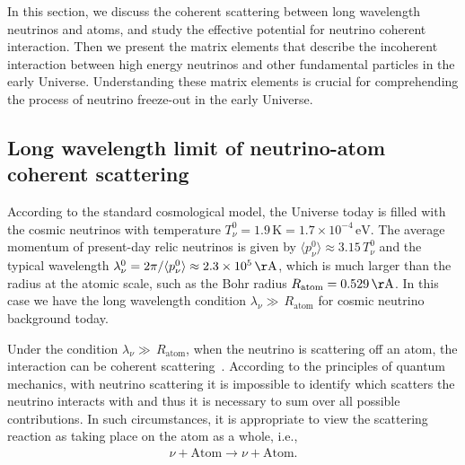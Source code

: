 In this section, we discuss the coherent scattering between long wavelength neutrinos and atoms, and study the effective potential for neutrino coherent interaction. Then we present the matrix elements that describe the incoherent interaction between high energy neutrinos and other fundamental particles in the early Universe. Understanding these matrix elements is crucial for comprehending the process of neutrino freeze-out in the early Universe.


\subsection{Long wavelength limit of neutrino-atom coherent scattering}\label{LongWavelength}
According to the standard cosmological model, the Universe today is filled with the cosmic neutrinos with temperature $T_{\nu}^0=1.9 \,\mathrm{K}=1.7\times10^{-4}\,\mathrm{eV}$.
The average momentum of present-day relic neutrinos is given by $\langle p_\nu^0\rangle\approx3.15\,T_\nu^0$ and the typical wavelength $\lambda_\nu^0={2\pi}/{\langle p_\nu^0\rangle}\approx2.3\times10^5\,\mathrm{\AA}$, which is much larger than the radius at the atomic scale, such as the Bohr radius $R_{\mathrm{atom}}=0.529\,\mathrm{\AA}$. In this case we have the long wavelength condition $\lambda_\nu\gg\,R_{\mathrm{atom}}$ for cosmic neutrino background today.  

Under the condition $\lambda_\nu\gg\,R_{\mathrm{atom}}$, when the neutrino is scattering off an atom, the interaction can be coherent scattering~\cite{PhysRevD.38.32,Lewis:1979mu,Papavassiliou:2005cs}. According to the principles of quantum mechanics, with neutrino scattering it is impossible to identify which scatters the neutrino interacts with and thus it is necessary to sum over all possible contributions. In such circumstances, it is appropriate to view the scattering reaction as taking place on the atom as a whole, i.e.,
\begin{align}
\nu+\mathrm{Atom}\longrightarrow\nu+\mathrm{Atom}.
\end{align}

